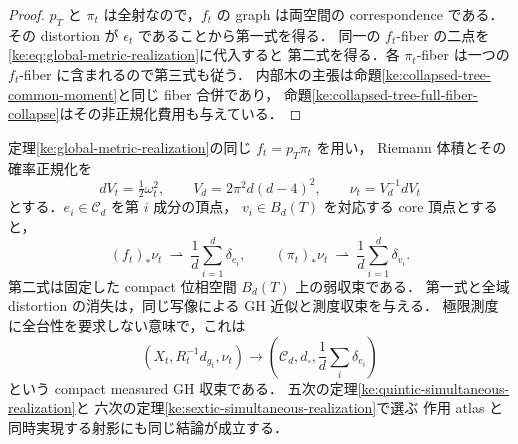 \begin{proof}
$p_T$ と $\pi_t$ は全射なので，$f_t$ の graph は両空間の correspondence である．
その distortion が $\epsilon_t$ であることから第一式を得る．
同一の $f_t$-fiber の二点を\eqref{ke:eq:global-metric-realization}に代入すると
第二式を得る．各 $\pi_t$-fiber は一つの $f_t$-fiber に含まれるので第三式も従う．
内部木の主張は命題\ref{ke:collapsed-tree-common-moment}と同じ fiber 合併であり，
命題\ref{ke:collapsed-tree-full-fiber-collapse}はその非正規化費用も与えている．
\end{proof}

\begin{corollary}[同じ射影による体積測度の極限]
\label{ke:global-volume-measure}
定理\ref{ke:global-metric-realization}の同じ $f_t=p_T\pi_t$ を用い，
Riemann 体積とその確率正規化を
\[
 dV_t=\tfrac12\omega_t^2,\qquad
 V_d=2\pi^2d(d-4)^2,\qquad \nu_t=V_d^{-1}dV_t
\]
とする．$e_i\in\mathcal C_d$ を第 $i$ 成分の頂点，
$v_i\in B_d(T)$ を対応する core 頂点とすると，
\begin{equation}\label{ke:eq:global-volume-measure}
 (f_t)_*\nu_t\ \rightharpoonup\ \frac1d\sum_{i=1}^d\delta_{e_i},
 \qquad
 (\pi_t)_*\nu_t\ \rightharpoonup\ \frac1d\sum_{i=1}^d\delta_{v_i}.
\end{equation}
第二式は固定した compact 位相空間 $B_d(T)$ 上の弱収束である．
第一式と全域 distortion の消失は，同じ写像による GH 近似と測度収束を与える．
極限測度に全台性を要求しない意味で，これは
\[
 (X_t,R_t^{-1}d_{g_t},\nu_t)
 \longrightarrow
 \left(\mathcal C_d,d_\square,\frac1d\sum_i\delta_{e_i}\right)
\]
という compact measured GH 収束である．
五次の定理\ref{ke:quintic-simultaneous-realization}と
六次の定理\ref{ke:sextic-simultaneous-realization}で選ぶ
作用 atlas と同時実現する射影にも同じ結論が成立する．
\end{corollary}

